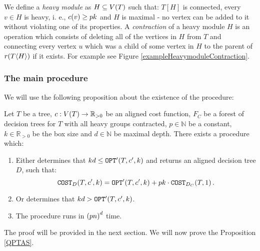 
We define a \textit{heavy module} as $H\subseteq V\mathopen{}\left( T \right)$ such that: $T[H]$ is connected, every $v \in H$ is heavy, i. e., $c\mathopen{}\left( v \right)\geq pk$ and $H$ is maximal - no vertex can be added to it without violating one of its properties. A \textit{contraction} of a heavy module $H$ is an operation which consists of deleting all of the vertices in $H$ from $T$ and connecting every vertex $u$ which was a child of some vertex in $H$ to the parent of $r\mathopen{}\left( T\mathopen{}\langle H \rangle \right)$ if it exists. For example see Figure \ref{exampleHeavymoduleContraction}.

\subsubsection{The main procedure}

We will use the following proposition about the existence of the \FBuildDT procedure:
\begin{proposition}\label{BuildDTPropodisition}
     Let $T$ be a tree, $c:V\mathopen{}\left( T \right)\to \mathbb{R}_{>0}$ be an aligned cost function, $F_C$ be a forest of decision trees for $T$ with all heavy groups contracted, $p\in \mathbb{N}$ be a constant, $k\in \mathbb{R}_{>0}$ be the box size and $d\in \mathbb{N}$ be maximal depth. There exists a \FBuildDT procedure which:
     \begin{enumerate}
        \item Either determines that $kd\leq \texttt{OPT}'\mathopen{}\left( T, c',k \right)$ and returns an aligned decision tree $D$, such that:
        $$
            \texttt{COST}_{D}\mathopen{}\left( T,c',k \right)=\texttt{OPT}'\mathopen{}\left( T,c',k \right)+pk\cdot \texttt{COST}_{D_C}\mathopen{}\left( T,1 \right).
        $$
        \item Or determines that $kd > \texttt{OPT}'\mathopen{}\left( T, c',k \right)$.
        \item The procedure runs in $\mathopen{}\left( pn \right)^d$ time.
     \end{enumerate}
\end{proposition}
The proof will be provided in the next section.
We will now prove the Proposition \ref{QPTAS}.



